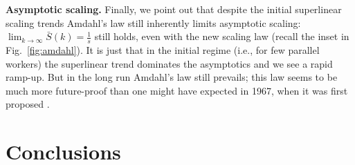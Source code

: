 \documentclass[letterpaper,twocolumn,10pt]{article}
\begin{document}
\noindent
\textbf{Asymptotic scaling.} %
Finally, we point out that despite the initial superlinear scaling trends Amdahl's law still inherently limits asymptotic scaling: $\lim_{k\to \infty}\bar{S}(k) = \frac1{s}$ still holds, even with the new scaling law (recall the inset in Fig.~\ref{fig:amdahl}). It is just that in the initial regime (i.e., for few parallel workers) the superlinear trend dominates the asymptotics and we see a rapid ramp-up. But in the long run Amdahl's law still prevails; this law seems to be much more future-proof than one might have expected in 1967, when it was first proposed \cite{10.1145/1465482.1465560}.

\section{Conclusions}
\label{sec:conclusion}

 
\begin{small}

\end{small}
\end{document}
